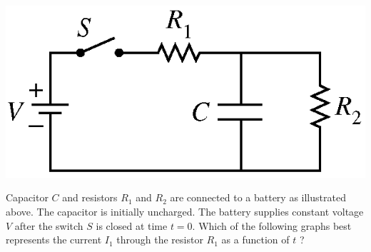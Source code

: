 \begin{center}
\includegraphics[scale=0.3]{images/img-009-010.png}
\end{center}

\begin{questions}\setcounter{question}{16}\question
Capacitor $C$ and resistors $R_{1}$ and $R_{2}$ are connected to a battery as illustrated above. The capacitor is initially uncharged. The battery supplies constant voltage $V$ after the switch $S$ is closed at time $t=0$. Which of the following graphs best represents the current $I_{1}$ through the resistor $R_{1}$ as a function of $t$ ?


\end{questions}
